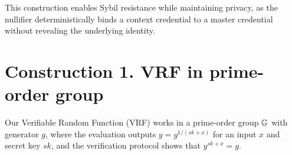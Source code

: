 This construction enables Sybil resistance while maintaining privacy, as the nullifier deterministically binds a context credential to a master credential without revealing the underlying identity.



















































\newpage










\section{Construction 1. VRF in prime-order group}
Our Verifiable Random Function (VRF) works in a prime-order group $\mathbb{G}$ with generator $g$, where the evaluation outputs $y = g^{1/(sk + x)}$ for an input $x$ and secret key $sk$, and the verification protocol shows that $y^{sk + x} = g$.

